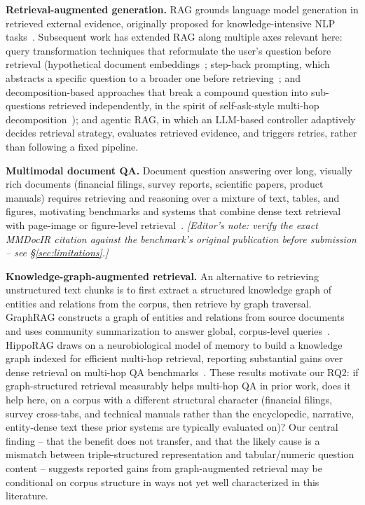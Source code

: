 \documentclass[sigconf,anonymous,review]{acmart}
\begin{document}
\textbf{Retrieval-augmented generation.} RAG grounds language model generation in retrieved external evidence, originally proposed for knowledge-intensive NLP tasks~\cite{lewis2020rag}. Subsequent work has extended RAG along multiple axes relevant here: query transformation techniques that reformulate the user's question before retrieval (hypothetical document embeddings~\cite{gao2023hyde}; step-back prompting, which abstracts a specific question to a broader one before retrieving~\cite{zheng2024stepback}; and decomposition-based approaches that break a compound question into sub-questions retrieved independently, in the spirit of self-ask-style multi-hop decomposition~\cite{press2022selfask}); and agentic RAG, in which an LLM-based controller adaptively decides retrieval strategy, evaluates retrieved evidence, and triggers retries, rather than following a fixed pipeline.

\textbf{Multimodal document QA.} Document question answering over long, visually rich documents (financial filings, survey reports, scientific papers, product manuals) requires retrieving and reasoning over a mixture of text, tables, and figures, motivating benchmarks and systems that combine dense text retrieval with page-image or figure-level retrieval~\cite{mmdocir}. \emph{[Editor's note: verify the exact MMDocIR citation against the benchmark's original publication before submission -- see \S\ref{sec:limitations}.]}

\textbf{Knowledge-graph-augmented retrieval.} An alternative to retrieving unstructured text chunks is to first extract a structured knowledge graph of entities and relations from the corpus, then retrieve by graph traversal. GraphRAG constructs a graph of entities and relations from source documents and uses community summarization to answer global, corpus-level queries~\cite{edge2024graphrag}. HippoRAG draws on a neurobiological model of memory to build a knowledge graph indexed for efficient multi-hop retrieval, reporting substantial gains over dense retrieval on multi-hop QA benchmarks~\cite{gutierrez2024hipporag}. These results motivate our RQ2: if graph-structured retrieval measurably helps multi-hop QA in prior work, does it help here, on a corpus with a different structural character (financial filings, survey cross-tabs, and technical manuals rather than the encyclopedic, narrative, entity-dense text these prior systems are typically evaluated on)? Our central finding -- that the benefit does not transfer, and that the likely cause is a mismatch between triple-structured representation and tabular/numeric question content -- suggests reported gains from graph-augmented retrieval may be conditional on corpus structure in ways not yet well characterized in this literature.
\end{document}
